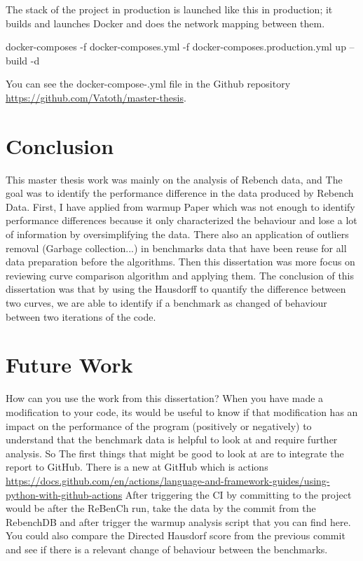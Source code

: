 \documentclass{article}
\begin{document}
The stack of the project in production is launched like this in production; it builds and launches Docker and does the network mapping between them.

docker-composes -f docker-composes.yml -f docker-composes.production.yml up --build -d

You can see the docker-compose-.yml file in the Github repository \url{https://github.com/Vatoth/master-thesis}. 



\section{Conclusion}


This master thesis work was mainly on the analysis of Rebench data, and The goal was to identify the performance difference in the data produced by Rebench Data. First, I have applied from \citep{barrett2017virtual} warmup Paper which was not enough to identify performance differences because it only characterized the behaviour and lose a lot of information by oversimplifying the data. There also an application of outliers removal (Garbage collection...) in benchmarks data that have been reuse for all data preparation before the algorithms.  Then this dissertation was more focus on reviewing curve comparison algorithm and applying them. The conclusion of this dissertation was that by using the Hausdorff to quantify the difference between two curves, we are able to identify if a benchmark as changed of behaviour between two iterations of the code.

\section{Future Work}

How can you use the work from this dissertation?
When you have made a modification to your code, its would be useful to know if that modification has an impact on the performance of the program (positively or negatively) to understand that the benchmark data is helpful to look at and require further analysis. So The first things that might be good to look at are to integrate the report to GitHub. There is a new  at GitHub which is  actions \url{https://docs.github.com/en/actions/language-and-framework-guides/using-python-with-github-actions}
After triggering the CI by committing to the project would be after the ReBenCh run, take the data by the commit from the RebenchDB and after trigger the warmup analysis script that you can find here.
You could also compare the Directed Hausdorf score from the previous commit and see if there is a relevant change of behaviour between the benchmarks. 


\end{document}
